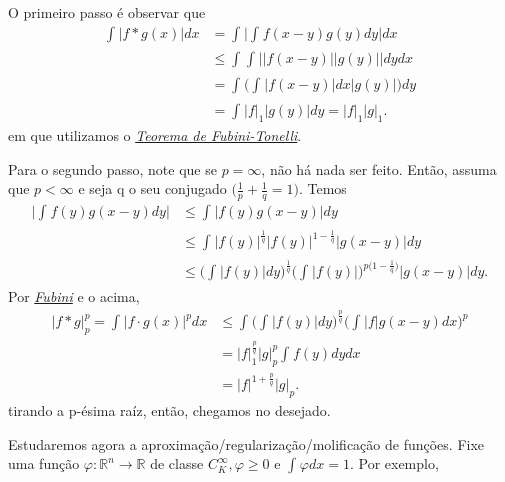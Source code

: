 \documentclass[measure_theory.tex]{subfiles}
\begin{document}
\begin{proof*}
	O primeiro passo é observar que
	\begin{align*}
		\int_{}^{}|f*g(x)|dx & = \int_{}^{}\biggl\vert \int_{}^{}f(x-y)g(y)dy \biggr\vert dx        \\
		                     & \leq \int_{}^{}\int_{}^{}\biggl\vert |f(x-y)||g(y)| \biggr\vert dydx \\
		                     & =\int_{}^{}\biggl(\int_{}^{}|f(x-y)|dx|g(y)|\biggr)dy                \\
		                     & = \int_{}^{}|f|_1|g(y)|dy = |f|_1|g|_1.
	\end{align*}
	em que utilizamos o \hyperlink{fubini_tonelli}{\textit{Teorema de Fubini-Tonelli}}.

	Para o segundo passo, note que se \(p = \infty\), não há nada ser feito. Então, assuma que \(p < \infty\) e seja q o seu conjugado \(\biggl(\frac{1}{p} + \frac{1}{q} = 1\biggr)\). Temos
	\begin{align*}
		\biggl\vert \int_{}^{}f(y)g(x-y)dy \biggr\vert & \leq \int_{}^{}|f(y)g(x-y)|dy                                                                                                \\
		                                               & \leq \int_{}^{}|f(y)|^{\frac{1}{q}}|f(y)|^{1-\frac{1}{q}}|g(x-y)|dy                                                          \\
		                                               & \leq \biggl(\int_{}^{}|f(y)|dy\biggr)^{\frac{1}{q}}\biggl(\int_{}^{}|f(y)|\biggr)^{p \biggl(1-\frac{1}{q}\biggr)}|g(x-y)|dy.
	\end{align*}
	Por \hyperlink{fubini_tonelli}{\textit{Fubini}} e o acima,
	\begin{align*}
		|f*g|_{p}^{p} = \int_{}^{}|f \cdot g(x)|^{p}dx & \leq \int_{}^{}\biggl(\int_{}^{}|f(y)|dy\biggr)^{\frac{p}{q}}\biggl(\int_{}^{}|f|g(x-y)dx\biggr)^{p} \\
		                                               & = |f|_{1}^{\frac{p}{q}}|g|_{p}^{p}\int_{}^{}f(y)dydx                                                 \\
		                                               & = |f|^{1 + \frac{p}{q}}|g|_{p}.
	\end{align*}
	tirando a p-ésima raíz, então, chegamos no desejado. \qedsymbol
\end{proof*}
Estudaremos agora a aproximação/regularização/molificação de funções. Fixe uma função \(\varphi : \mathbb{R}^{n}\rightarrow \mathbb{R}\) de classe \(C_{K}^{\infty}, \varphi \geq 0\) e \(\int_{}^{}\varphi dx = 1\). Por exemplo,
\end{document}
